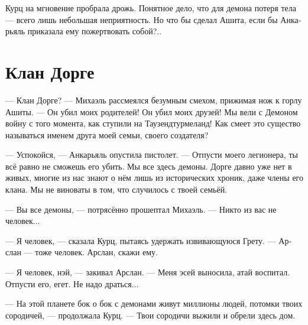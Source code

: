 \documentclass[a4paper,10pt,fleqn]{book}\usepackage{polyglossia}\setdefaultlanguage[babelshorthands=true]{russian}\setotherlanguage{english}\defaultfontfeatures{Ligatures=TeX,Mapping=tex-text}\usepackage{xcolor}\newcommand{\ml}[3]{#2}
\begin{document}
Курц на мгновение пробрала дрожь.
Понятное дело, что для демона потеря тела --- всего лишь небольшая неприятность.
Но что бы сделал Ашита, если бы Анкарьяль приказала ему пожертвовать собой?..

\section{Клан Дорге}

--- Клан Дорге? --- Михаэль рассмеялся безумным смехом, прижимая нож к горлу Ашиты.
\ml{$0$}
{--- Он убил моих родителей!}
{``It killed my parents!}
\ml{$0$}
{Он убил моих друзей!}
{It killed my friends!}
\ml{$0$}
{Мы вели с Демоном войну с того момента, как ступили на Таузендтурмеланд!}
{We were fighting the Demon since we landed Tausendt\"{u}rmeland!}
\ml{$0$}
{Как смеет это существо называться именем друга моей семьи, своего создателя?}
{How dare that thing to call itself the name of my family's friend, the name of its creator!''}

--- Успокойся, --- Анкарьяль опустила пистолет.
\ml{$0$}
{--- Отпусти моего легионера, ты всё равно не сможешь его убить.}
{``Release my leggionaire, you can't kill him anyway.}
\ml{$0$}
{Мы все здесь демоны.}
{We're all daemons here.}
\ml{$0$}
{Дорге давно уже нет в живых, многие из нас знают о нём лишь из исторических хроник, даже члены его клана.}
{Dourgue had gone long ago, most of us know him as but a part of history chronicles, even his kinsmen.}
\ml{$0$}
{Мы не виноваты в том, что случилось с твоей семьёй.}
{We're not responsible for what happened to your family.''}

--- Вы все демоны, --- потрясённо прошептал Михаэль.
\ml{$0$}
{--- Никто из вас не человек...}
{``No one of you is human ...''}

--- Я человек, --- сказала Курц, пытаясь удержать извивающуюся Грету.
\ml{$0$}
{--- Арслан --- тоже человек.}
{``Arslan is a human too.}
\ml{$0$}
{Арслан, скажи ему.}
{Arslan, tell him.''}

\ml{$0$}
{--- Я человек, нэй, --- закивал Арслан.}
{``I am a human, n\ae{},'' Arslan nodded.}
\ml{$0$}
{--- Меня эсей выносила, атай воспитал.}
{``\textit{\OE{}s\ae{}} carried me, \textit{at\ae{}} teached me.}
\ml{$0$}
{Отпусти его, егет.}
{Let him go, \textit{jeget}.}
\ml{$0$}
{Не надо драться...}
{There is no need in fighting ...''}

--- На этой планете бок о бок с демонами живут миллионы людей, потомки твоих сородичей, --- продолжала Курц.
--- Твои сородичи выжили и обрели здесь дом.
\end{document}
